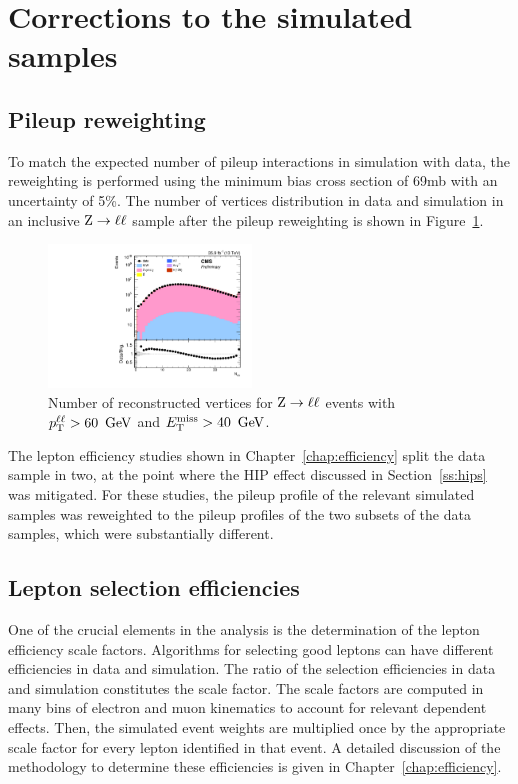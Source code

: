 \section{Corrections to the simulated samples}
\subsection{Pileup reweighting}
\label{subsec:puweights}

To match the expected number of pileup interactions in simulation with data,
the reweighting is performed using the minimum bias cross section of 69mb with an uncertainty of 5\%. 
The number of vertices distribution in data and simulation in an inclusive $\mathrm{Z} \to \ell\ell$ sample after the pileup reweighting 
is shown in Figure~\ref{fig:pileup_distribution}.

\begin{figure}[htbp]
  \centering
  \includegraphics[width=0.48\textwidth]{figures/zll_nvtx_met40_zpt60.pdf}
  \caption{
    Number of reconstructed vertices
    for $\mathrm{Z} \to \ell\ell$ events with $p_{\mathrm{T}}^{\ell\ell} > 60~\,\text{Ge\hspace{-.08em}V}$ and $E_\mathrm{T}^{\mathrm{miss}} > 40~\,\text{Ge\hspace{-.08em}V}$.
  }
  \label{fig:pileup_distribution}
\end{figure}

The lepton efficiency studies shown in Chapter~\ref{chap:efficiency} split the data sample in two,
at the point where the HIP effect discussed in Section~\ref{ss:hips} was mitigated.
For these studies, the pileup profile of the relevant simulated samples was reweighted to
the pileup profiles of the two subsets of the data samples, which were substantially different.

\subsection{Lepton selection efficiencies}
One of the crucial elements in the analysis is the determination of the lepton efficiency scale factors.
Algorithms for selecting good leptons can have different efficiencies in data and simulation.
The ratio of the selection efficiencies in data and simulation constitutes the scale factor.
The scale factors are computed in many bins of electron and muon kinematics to account for relevant dependent effects.
Then, the simulated event weights are multiplied once by the appropriate scale factor for every
lepton identified in that event. A detailed discussion of the methodology to determine these efficiencies is given in Chapter~\ref{chap:efficiency}.

